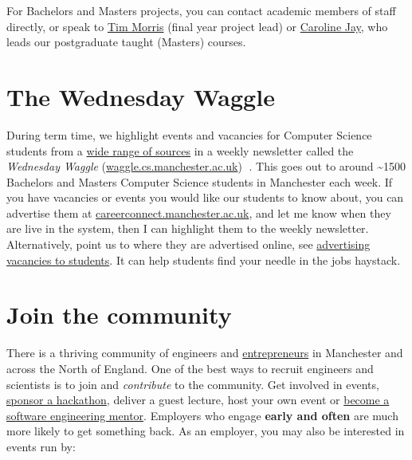 \documentclass[
  12pt,
]{book}
\begin{document}
For Bachelors and Masters projects, you can contact academic members of staff directly, or speak to \href{https://www.research.manchester.ac.uk/portal/tim.morris.html}{Tim Morris} (final year project lead) or \href{https://www.research.manchester.ac.uk/portal/caroline.jay.html}{Caroline Jay}, who leads our postgraduate taught (Masters) courses.

\hypertarget{the-wednesday-waggle}{%
\section{The Wednesday Waggle}\label{the-wednesday-waggle}}

During term time, we highlight events and vacancies for Computer Science students from a \href{https://www.cdyf.me/finding.html}{wide range of sources} in a weekly newsletter called the \emph{Wednesday Waggle} (\href{https://waggle.cs.manchester.ac.uk/waggle/about}{waggle.cs.manchester.ac.uk}) 🐝. This goes out to around \textasciitilde1500 Bachelors and Masters Computer Science students in Manchester each week. If you have vacancies or events you would like our students to know about, you can advertise them at \href{https://careerconnect.manchester.ac.uk/}{careerconnect.manchester.ac.uk}, and let me know when they are live in the system, then I can highlight them to the weekly newsletter. Alternatively, point us to where they are advertised online, see \href{https://www.cdyf.me/finding.html\#studentjobs}{advertising vacancies to students}. It can help students find your needle in the jobs haystack.

\hypertarget{join-the-community}{%
\section{Join the community}\label{join-the-community}}

There is a thriving community of engineers and \href{https://www.accelerateme.co/}{entrepreneurs} in Manchester and across the North of England. One of the best ways to recruit engineers and scientists is to join and \emph{contribute} to the community. Get involved in events, \href{https://www.unicsmcr.com/}{sponsor a hackathon}, deliver a guest lecture, host your own event or \href{https://www.cs.manchester.ac.uk/connect/business-engagement/industrial-mentoring/}{become a software engineering mentor}. Employers who engage \textbf{early and often} are much more likely to get something back. As an employer, you may also be interested in events run by:
\end{document}
